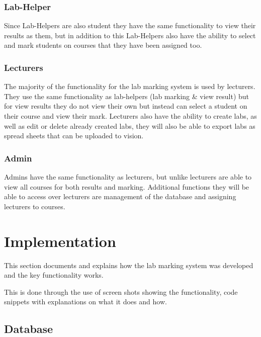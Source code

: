 \documentclass[12pt]{article}  %
\begin{document}
\subsubsection*{Lab-Helper}
Since Lab-Helpers are also student they have the same functionality to view their results as them, but in addition to this Lab-Helpers also have the ability to select and mark students on courses that they have been assigned too. 


\subsubsection*{Lecturers}

The majority of the functionality for the lab marking system is used by lecturers. They use the same functionality as lab-helpers (lab marking \& view result) but for view results they do not view their own but instead can select a student on their course and view their mark. Lecturers also have the ability to create labs, as well as edit or delete already created labs, they will also be able to export labs as spread sheets that can be uploaded to vision.  


\subsubsection*{Admin}
Admins have the same functionality as lecturers, but unlike lecturers are able to view all courses for both results and marking. Additional functions they will be able to access over lecturers are management of the database and assigning lecturers to courses.







\newpage
\section{Implementation}
This section documents and explains how the lab marking system was developed and the key functionality works. 

This is done through the use of screen shots showing the functionality, code snippets with explanations on what it does and how.   

\subsection{Database}
\end{document}
